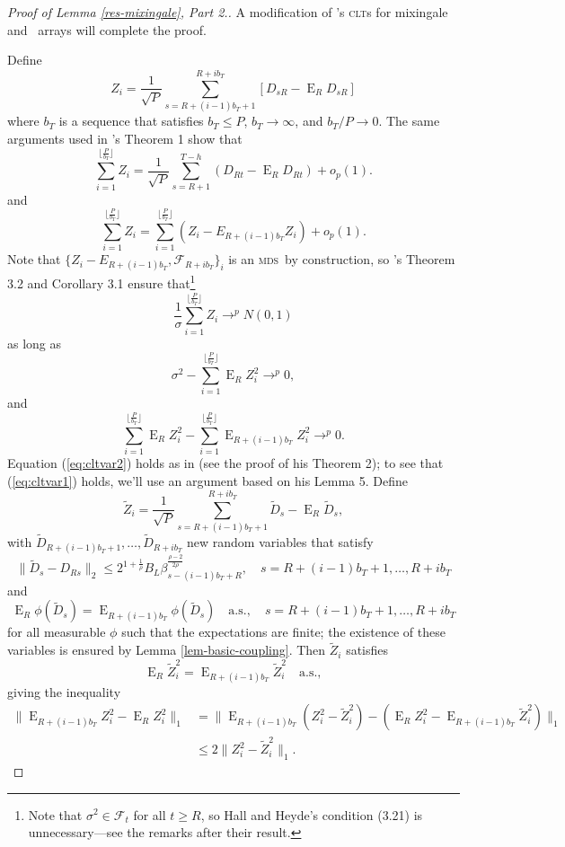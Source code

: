 \documentclass[11pt]{article}
\DeclareMathOperator{\E}{E}
\newcommand{\citepos}[1]{\citeauthor{#1}'s \citeyearpar{#1}}
\newcommand{\oosSum}[2]{\ensuremath{\sum_{#1=R+#2}^{T-\h}}}
\newcommand{\h}{h}
\newcommand{\InnerBlockL}[1]{\ensuremath{R+(#1-1)b_T + 1}}
\newcommand{\InnerBlockU}[1]{\ensuremath{R+#1 b_T}}
\newcommand{\OuterBlockU}{\lfloor \frac P{b_T} \rfloor}
\newcommand{\SumOuterBlock}[1]{\ensuremath{\sum_{#1=1}^{\OuterBlockU}}}
\newcommand{\SumInnerBlock}[2]{\ensuremath{\sum_{#1=\InnerBlockL{#2}}^{\InnerBlockU{#2}}}}
\newcommand{\CEOuterBlock}[2]{\ensuremath{\E_{\InnerBlockU{(#2-1)}} #1}}
\newcommand{\ZSummand}{D_{sR} - \E_R D_{sR}}
\newcommand{\ZDef}{ \frac1{\sqrt{P}} \SumInnerBlock{s}{i} [\ZSummand]}
\newcommand{\ZSqCE}{\ensuremath{\CEOuterBlock{Z_i^2}{i}}}
\newcommand{\rhoExp}{\ensuremath{\frac{\rho-2}{2\rho}}}
\newcommand{\mds}{\textsc{mds}}
\newcommand{\clt}{\textsc{clt}}
\begin{document}
\begin{proof}[Proof of Lemma \ref{res-mixingale}, Part 2.]
  A modification of \citepos{Jon:97} \clt s for
  mixingale and \ned\ arrays will complete the proof.

Define
\[\label{eq:z1}
  Z_i = \ZDef
\]
where $b_T$ is a sequence that satisfies $b_T\leq P$,
$b_T\to\infty$, and $b_T/P\to 0$.  The same arguments used in
\citepos{Jon:97} Theorem 1 show that
\begin{equation*}
   \SumOuterBlock{i} Z_i = \frac1{\sqrt{P}} \oosSum{s}{1} (D_{Rt} - \E_R D_{Rt}) + o_p(1).
\end{equation*}
and
\begin{equation*}
  \SumOuterBlock{i} Z_i = \SumOuterBlock{i} (Z_i - E_{R + (i-1)b_T}
  Z_i) + o_p(1).
\end{equation*}
Note that $\{Z_i - E_{R + (i-1)b_T},\mathcal{F}_{R + i b_T}\}_i$ is an
\mds\ by construction, so \citepos{HaH:80} Theorem 3.2 and Corollary
3.1 ensure that\footnote{Note that $\sigma^2 \in \mathcal{F}_t$ for
  all $t \geq R$, so Hall and Heyde's condition (3.21) is
  unnecessary---see the remarks after their result.}
\[
\frac1{\sigma} \SumOuterBlock{i} Z_i \to^p
N(0,1)
\]
as long as
\begin{equation}\label{eq:cltvar2}
  \sigma^2 - \SumOuterBlock{i} \E_R Z_i^2 \to^p 0,
\end{equation}
and
\begin{equation}\label{eq:cltvar1}
  \SumOuterBlock{i} \E_R Z_i^2 - \SumOuterBlock{i} \ZSqCE \to^p 0.
\end{equation}
Equation (\ref{eq:cltvar2}) holds as in \citet{Jon:97} (see the proof
of his Theorem 2); to see that (\ref{eq:cltvar1}) holds, we'll use an
argument based on his Lemma 5.  Define
\[
\tilde Z_i = \frac1{\sqrt{P}} \SumInnerBlock{s}{i} \tilde D_s -
\E_R \tilde D_s,
\]
with $\tilde D_{R+(i-1)b_T + 1},\dots,\tilde D_{R+ib_T}$ new random
variables that satisfy
\[
\lVert \tilde D_s - D_{Rs} \rVert_2 \leq 2^{1 + \frac1\rho} B_L \beta_{s -
  (i-1)b_T + R}^{\rhoExp}, \quad s = R+(i-1)b_T + 1,\dots,R+i b_T
\]
and
\[
\E_R \phi(\tilde D_s) = \E_{R+(i-1)b_T} \phi(\tilde D_s) \quad \text{a.s.}, \quad s = R+(i-1)b_T + 1,\dots,R+i b_T
\]
for all measurable $\phi$ such that the expectations are finite; the
existence of these variables is ensured by Lemma
\ref{lem-basic-coupling}.  Then $\tilde Z_i$ satisfies
\[
\E_R \tilde Z_i^2 = \CEOuterBlock{\tilde Z_i^2}{i} \quad \text{a.s.},
\]
giving the inequality
\begin{align*}
  \lVert \ZSqCE - \E_R Z_i^2 \rVert_1 &= \lVert
  \CEOuterBlock{(Z_i^2 - \tilde Z_i^2)}{i} - (\E_R Z_i^2 -
  \CEOuterBlock{\tilde Z_i^2}{i}) \rVert_1 \\ & \leq 2 \lVert Z_i^2 -
  \tilde Z_i^2 \rVert_1.
\end{align*}


\end{proof}
\end{document}
